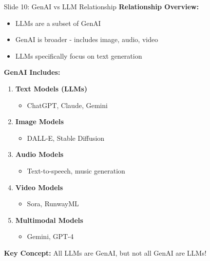\documentclass[8pt]{beamer}
\begin{document}
	\begin{frame}{Slide 10: GenAI vs LLM Relationship}
		\fontsize{6.5}{7.5}\selectfont
		\textbf{Relationship Overview:}
		\begin{itemize}
			\item LLMs are a subset of GenAI
			\item GenAI is broader - includes image, audio, video
			\item LLMs specifically focus on text generation
		\end{itemize}
		
		\vspace{0.1cm}
		\textbf{GenAI Includes:}
		\begin{enumerate}
			\item \textbf{Text Models (LLMs)}
			\begin{itemize}
				\item ChatGPT, Claude, Gemini
			\end{itemize}
			\item \textbf{Image Models}
			\begin{itemize}
				\item DALL-E, Stable Diffusion
			\end{itemize}
			\item \textbf{Audio Models}
			\begin{itemize}
				\item Text-to-speech, music generation
			\end{itemize}
			\item \textbf{Video Models}
			\begin{itemize}
				\item Sora, RunwayML
			\end{itemize}
			\item \textbf{Multimodal Models}
			\begin{itemize}
				\item Gemini, GPT-4
			\end{itemize}
		\end{enumerate}
		
		\textcolor{myblue}{\textbf{Key Concept:}} All LLMs are GenAI, but not all GenAI are LLMs!
	\end{frame}
	
	
\end{document}
